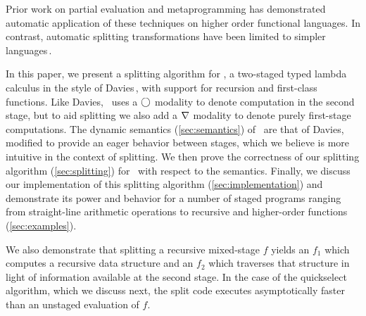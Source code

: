 
Prior work on partial evaluation and metaprogramming has demonstrated
automatic application of these techniques on higher order functional
languages. In contrast, automatic splitting transformations have been
limited to simpler languages\,\cite{knoblock96,Proudfoot:2001,Foley:2011,He:2014}. 

In this paper, we present a splitting algorithm for \lang, 
a two-staged typed lambda calculus in the style of Davies\,\cite{davies96},
with support for recursion and first-class functions.
Like Davies, \lang\ uses a $\bigcirc$ modality to denote computation in the second stage,
but to aid splitting we also add a $\nabla$ modality to denote purely first-stage computations. 
The dynamic semantics (\ref{sec:semantics}) of \lang\ are that of Davies, 
modified to provide an eager behavior between stages, which we believe is more intuitive in the context of splitting.
We then prove the correctness of our splitting algorithm (\ref{sec:splitting}) for \lang\ with respect to the semantics.
Finally, we discuss our implementation of this splitting algorithm
(\ref{sec:implementation}) and demonstrate its power and behavior
for a number of staged programs ranging from straight-line arithmetic
operations to recursive and higher-order functions (\ref{sec:examples}).

We also demonstrate that splitting a recursive mixed-stage $f$
yields an $f_1$ which computes a recursive data structure
and an $f_2$ which traverses that structure
in light of information available at the second stage.
In the case of the quickselect algorithm, which we discuss next, 
the split code executes asymptotically faster than an unstaged evaluation of $f$.

